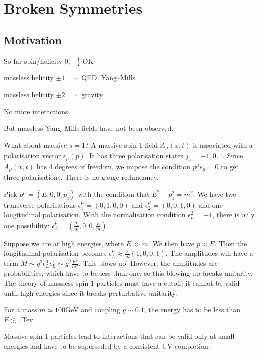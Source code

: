 
\chapter{Broken Symmetries}%
\label{cha:broken_symmetries}

\section{Motivation}%
\label{sec:motivation}

So far spin/helicity $0, \pm \frac{1}{2}$ OK

massless helicity $\pm 1 \implies$  QED, Yang--Mills

massless helicity $\pm 2 \implies$ gravity

No more interactions.

But massless Yang--Mills fields have not been observed.

What about massive $s = 1$?
A massive spin-1 field $A_{\mu}(x, t)$ is associated with a polarisation vector $\epsilon_{\mu}(p)$.
It has three polarisation states $j_z = -1, 0, 1$.
Since $A_{\mu}(x, t)$ has 4 degrees of freedom, we impose the condition $p^{\mu}\epsilon_{\mu} = 0$ to get three polarisations. There is no gauge redundancy.

Pick $p^{\mu} = (E, 0,0, p_z)$ with the condition that $E^2 - p_z^2 = m^2$.
We have two transverse polarisations $\epsilon^{\mu}_1 = (0,1,0,0)$ and $\epsilon^{\mu}_2 = (0,0,1,0)$ and one longitudinal polarisation.
With the normalisation condition $\epsilon_{\mu}^2 = -1$, there is only one possibility: $\epsilon^{\mu}_L = (\frac{p_z}{m}, 0,0, \frac{E}{m})$.

Suppose we are at high energies, where $E \gg m$. We then have $p \approx E$.
Then the longitudinal polarisation becomes $\epsilon^{\mu}_L \approx \frac{E}{m}(1,0,0,1)$.
The amplitudes will have a term $M \sim g^2 \epsilon^0_L \epsilon^z_L \sim g^2 \frac{E^2}{m^2}$. This blows up!
However, the amplitudes are probabilities, which have to be less than one; so this blowing-up breaks unitarity. The theory of massless spin-1 particles must have a cutoff; it cannot be valid until high energies since it breaks perturbative unitarity.
\begin{example}[]
  For a mass $m \simeq 100$GeV and coupling $g \sim 0.1$, the energy has to be less than $E \lesssim 1$Tev.
\end{example}
Massive spin-1 particles lead to interactions that can be valid only at small energies and have to be superseded by a consistent UV completion.

